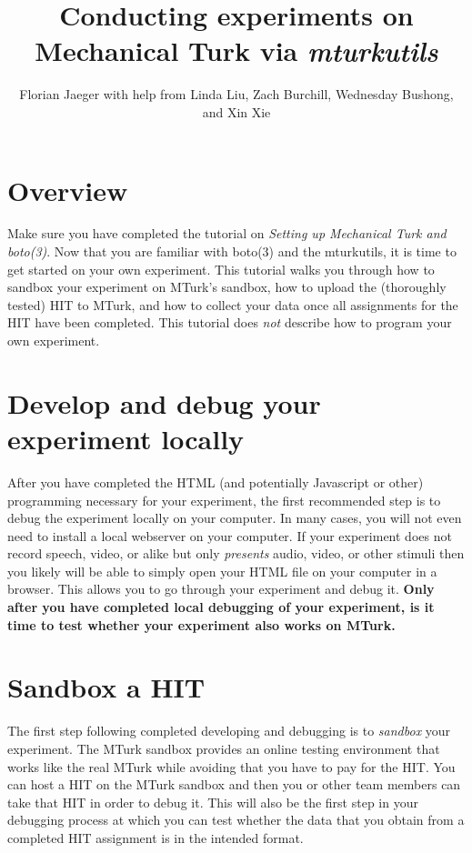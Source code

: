 \documentclass{article}
\title{Conducting experiments on Mechanical Turk via {\em mturkutils}}
\author{Florian Jaeger with help from Linda Liu, Zach Burchill, Wednesday Bushong, and Xin Xie}
\begin{document}
\maketitle

\tableofcontents

\section{Overview}

Make sure you have completed the tutorial on {\em Setting up Mechanical Turk and boto(3)}. Now that you are familiar with boto(3) and the mturkutils, it is time to get started on your own experiment. This tutorial walks you through how to sandbox your experiment on MTurk's sandbox, how to upload the (thoroughly tested) HIT to MTurk, and how to collect your data once all assignments for the HIT have been completed. This tutorial does {\em not} describe how to program your own experiment.


\section{Develop and debug your experiment locally}

After you have completed the HTML (and potentially Javascript or other) programming necessary for your experiment, the first recommended step is to debug the experiment locally on your computer. In many cases, you will not even need to install a local webserver on your computer. If your experiment does not record speech, video, or alike but only {\em presents} audio, video, or other stimuli then you likely will be able to simply open your HTML file on your computer in a browser. This allows you to go through your experiment and debug it. \textbf{Only after you have completed local debugging of your experiment, is it time to test whether your experiment also works on MTurk.}



\section{Sandbox a HIT}

The first step following completed developing and debugging is to {\em sandbox} your experiment. The MTurk sandbox provides an online testing environment that works like the real MTurk while avoiding that you have to pay for the HIT. You can host a HIT on the MTurk sandbox and then you or other team members can take that HIT in order to debug it. This will also be the first step in your debugging process at which you can test whether the data that you obtain from a completed HIT assignment is in the intended format.
\end{document}
